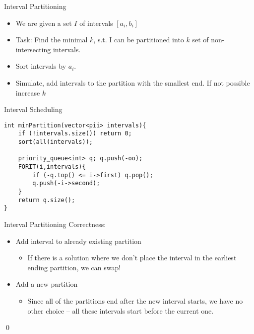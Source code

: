 \documentclass[12pt,t]{beamer}
\newcommand{\bi}{\begin{itemize}}
\newcommand{\ei}{\end{itemize}}
\begin{document}
\begin{frame}[fragile]{Interval Partitioning}
    \vspace{30pt}
    \bi
        \item We are given a set $I$ of intervals $[a_i,b_i]$
        \item<2-> Task: Find the minimal $k$, s.t. I can be partitioned into $k$ set of non-intersecting intervals.
	    \vspace{30pt}
	    \item<3-> Sort intervals by $a_i$.
	    \item<4-> Simulate, add intervals to the partition with the smallest end.
	    If not possible increase $k$
    \ei
\end{frame}


\begin{frame}[fragile]{Interval Scheduling}
    \vspace{30pt}
    \begin{verbatim}
int minPartition(vector<pii> intervals){
    if (!intervals.size()) return 0;
    sort(all(intervals));

    priority_queue<int> q; q.push(-oo);
    FORIT(i,intervals){
        if (-q.top() <= i->first) q.pop();
        q.push(-i->second);
    }
    return q.size();
}
    \end{verbatim}
\end{frame}

\begin{frame}[fragile]{Interval Partitioning}
    \vspace{30pt}
    {\color{hilight}Correctness:}
    \bi
    	\item Add interval to already existing partition
    	\bi
    		\item If there is a solution where we don't place the interval in the earliest ending partition, we can swap!
    	\ei
        \item Add a new partition
        \bi
	        \item Since all of the partitions end after the new interval starts, we have no other choice -- all these intervals start before the current one.
        \ei
    \ei
    \flushleft\qed
\end{frame}
\end{document}
